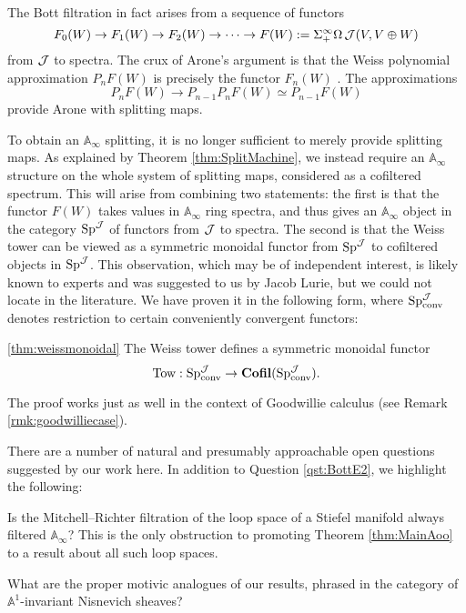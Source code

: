 The Bott filtration in fact arises from a sequence of functors $$F_0(W) \to F_1(W) \to F_2(W) \to \cdots \to F(W) := \Sigma^{\infty}_+ \Omega \operatorname{\mathcal{J}}(V, V\oplus W)$$ from $\operatorname{\mathcal{J}}$ to spectra.  The crux of Arone's argument is that the Weiss polynomial approximation $P_n F(W)$ is precisely the functor $F_n(W)$ \cite{Arone}.  The approximations $$P_n F(W) \rightarrow P_{n-1} P_n F(W) \simeq P_{n-1} F(W)$$ provide Arone with splitting maps.

To obtain an $\mathbb{A}_\infty$ splitting, it is no longer sufficient to merely provide splitting maps.  As explained by Theorem \ref{thm:SplitMachine}, we instead require an $\mathbb{A}_\infty$ structure on the whole system of splitting maps, considered as a cofiltered spectrum.  This will arise from combining two statements: the first is that the functor $F(W)$ takes values in $\mathbb{A}_\infty$ ring spectra, and thus gives an $\mathbb{A}_\infty$ object in the category $\operatorname{\mathrm{Sp}}^{\operatorname{\mathcal{J}}}$ of functors from $\operatorname{\mathcal{J}}$ to spectra.  The second is that the Weiss tower can be viewed as a symmetric monoidal functor from $\operatorname{\mathrm{Sp}}^{\operatorname{\mathcal{J}}}$ to cofiltered objects in $\operatorname{\mathrm{Sp}}^{\operatorname{\mathcal{J}}}$.  This observation, which may be of independent interest, is likely known to experts and was suggested to us by Jacob Lurie, but we could not locate in the literature.  We have proven it in the following form, where $\operatorname{\mathrm{Sp}}^{\operatorname{\mathcal{J}}}_{\text{conv}}$ denotes restriction to certain conveniently convergent functors:
\begin{customthm}{\ref{thm:weissmonoidal}}
The Weiss tower defines a symmetric monoidal functor $$\text{Tow}: \operatorname{\mathrm{Sp}}^{\operatorname{\mathcal{J}}}_{\text{conv}} \to \operatorname{\mathbf{Cofil}}(\operatorname{\mathrm{Sp}}^{\operatorname{\mathcal{J}}}_{\text{conv}}).$$
\end{customthm}
\begin{rmk*}
The proof works just as well in the context of Goodwillie calculus (see Remark \ref{rmk:goodwilliecase}).  
\end{rmk*}

There are a number of natural and presumably approachable open questions suggested by our work here.  In addition to Question \ref{qst:BottE2}, we highlight the following:

\begin{qst}
Is the Mitchell--Richter filtration of the loop space of a Stiefel manifold always filtered $\mathbb{A}_\infty$?  This is the only obstruction to promoting Theorem \ref{thm:MainAoo} to a result about all such loop spaces.
\end{qst}

\begin{qst}
What are the proper motivic analogues of our results, phrased in the category of $\mathbb{A}^1$-invariant Nisnevich sheaves?
\end{qst}

